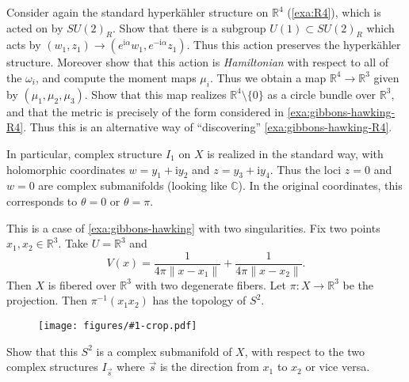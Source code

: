\documentclass[12pt,letterpaper,reqno]{amsart}
\numberwithin{equation}{section}
\newcommand{\R}{\ensuremath{\mathbb R}}
\newcommand{\C}{\ensuremath{\mathbb C}}
\newcommand{\bbH}{\ensuremath{\mathbb H}}
\newcommand{\hk}{hyperk\"ahler\xspace}
\newcommand{\I}{{\mathrm i}}
\newcommand{\norm}[1]{\lVert#1\rVert}
\newcommand{\ti}[1]{\textit{#1}}
\newcommand{\insfig}[2]{\begin{figure}[htbp] \centering \texttt{[image: figures/\#1-crop.pdf]} \label{fig:#1} \end{figure}}
\newcommand{\fixme}[1]{{\color{blue}{[#1]}}}
\newcommand{\currentposition}{{\color{blue} \noindent\makebox[\linewidth]{\hdashrule{\paperwidth}{1pt}{3mm}}}}
\begin{document}
\begin{exercise}
Consider again the standard \hk structure on $\R^4$ 
(\autoref{exa:R4}), which is acted on by $SU(2)_R$.
Show that there is a subgroup $U(1) \subset SU(2)_R$ which acts
by $(w_1,z_1) \to (e^{\I \alpha} w_1, e^{-\I\alpha} z_1)$.
Thus this action preserves the \hk structure.
Moreover show that this action is \ti{Hamiltonian} with 
respect to all of the $\omega_i$, and compute the moment
maps $\mu_i$. Thus we obtain a map $\R^4 \to \R^3$ given by
$(\mu_1, \mu_2, \mu_3)$. Show that this map realizes
$\R^4 \setminus \{0\}$ as a circle bundle over $\R^3$,
and that the metric is precisely of the form considered 
in \autoref{exa:gibbons-hawking-R4}. Thus this is an alternative
way of ``discovering'' \autoref{exa:gibbons-hawking-R4}.
\end{exercise}

\currentposition

In particular, complex structure $I_1$ on $X$ is realized in the standard way,
with holomorphic coordinates $w = y_1 + \I y_2$ and $z = y_3 + \I y_4$.
Thus the loci $z = 0$ and $w = 0$ are complex submanifolds (looking like $\C$).
In the original coordinates, this corresponds to $\theta = 0$ or $\theta = \pi$.

\fixme{insert figure here}


\begin{example}
This is a case of \autoref{exa:gibbons-hawking}
with two singularities. Fix two points
$x_1, x_2 \in \R^3$.
Take $U = \R^3$ and 
\begin{equation}
  V(x) = \frac{1}{4\pi \norm{x - x_1}} + \frac{1}{4\pi \norm{x - x_2}}.
\end{equation}
Then $X$ is fibered over $\R^3$ with two degenerate fibers.
Let $\pi: X \to \R^3$ be the projection.
Then $\pi^{-1}(x_1 x_2)$ has the topology of $S^2$.
\end{example}

\insfig{higgs-bundles-3}{0.8}

\begin{exercise}
Show that this $S^2$ is a complex submanifold of $X$, with
respect to the two complex structures $I_{\vec s}$ where $\vec s$
is the direction from $x_1$ to $x_2$ or vice versa.
\end{exercise}
\end{document}
